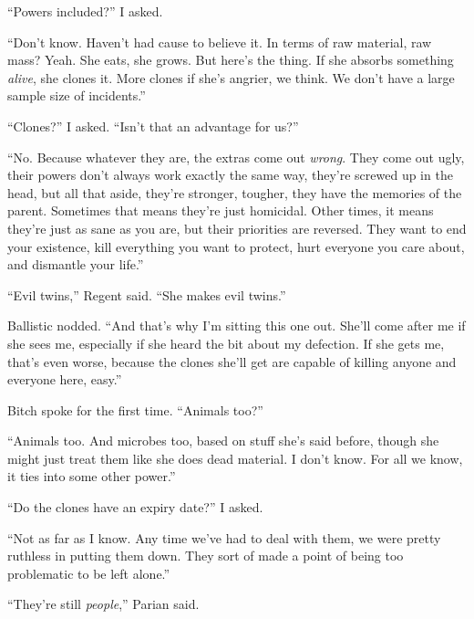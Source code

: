 ``Powers included?'' I asked.



``Don't know.  Haven't had cause to believe it.  In terms of raw material, raw mass?  Yeah.  She eats, she grows.  But here's the thing.  If she absorbs something \emph{alive}, she clones it.  More clones if she's angrier, we think.  We don't have a large sample size of incidents.''



``Clones?'' I asked.  ``Isn't that an advantage for us?''



``No.  Because whatever they are, the extras come out \emph{wrong}.  They come out ugly, their powers don't always work exactly the same way, they're screwed up in the head, but all that aside, they're stronger, tougher, they have the memories of the parent.  Sometimes that means they're just homicidal.  Other times, it means they're just as sane as you are, but their priorities are reversed.  They want to end your existence, kill everything you want to protect, hurt everyone you care about, and dismantle your life.''



``Evil twins,'' Regent said.  ``She makes evil twins.''



Ballistic nodded.  ``And that's why I'm sitting this one out.  She'll come after me if she sees me, especially if she heard the bit about my defection.  If she gets me, that's even worse, because the clones she'll get are capable of killing anyone and everyone here, easy.''



Bitch spoke for the first time.  ``Animals too?''



``Animals too.  And microbes too, based on stuff she's said before, though she might just treat them like she does dead material.  I don't know.  For all we know, it ties into some other power.''



``Do the clones have an expiry date?''  I asked.



``Not as far as I know.  Any time we've had to deal with them, we were pretty ruthless in putting them down.  They sort of made a point of being too problematic to be left alone.''



``They're still \emph{people},'' Parian said.



